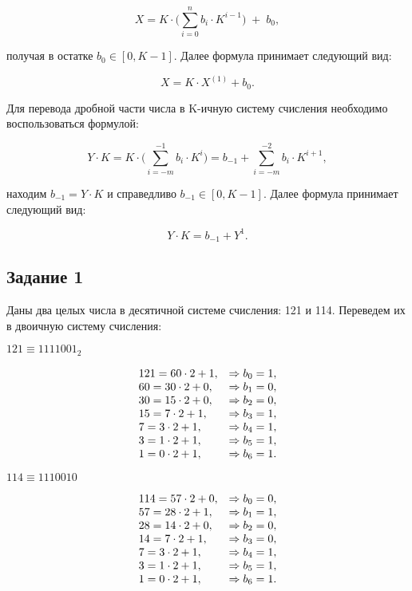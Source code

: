 \documentclass[a4paper,14pt]{extarticle}
\begin{document}
  \[
    X = K \cdot \Biggl(\sum_{i=0}^{n}b_{i} \cdot K^{i-1}\Biggl)\;+\; b_{0},
  \]

  \noindent получая в остатке $b_{0} \in [0, K - 1]$. Далее формула принимает следующий вид:

  \[
    X = K \cdot X^{(1)} + b_{0}.
  \]

  Для перевода дробной части числа в K-ичную систему счисления необходимо воспользоваться формулой:

  \[
    Y \cdot K = K \cdot \Biggl(\sum_{i=-m}^{-1}b_{i} \cdot K^{i}\Biggl) =b_{-1} + \sum_{i=-m}^{-2}b_{i} \cdot K^{i+1},
  \]

  находим $b_{-1} = Y \cdot K$ и справедливо $b_{-1} \in [0, K - 1]$. Далее формула принимает следующий вид:

  \[
    Y \cdot K = b_{-1} + Y^{1}.
  \]

  \subsection*{Задание 1}
  Даны два целых числа в десятичной системе счисления: 121 и 114. Переведем их в двоичную систему счисления:

  $121 \equiv 1111001_{2}$

  \[
  \begin{array}[c]{ll}
    121 = 60 \cdot 2 + 1, &\Rightarrow b_{0} = 1,\\
    60 = 30 \cdot 2 + 0, &\Rightarrow b_{1} = 0,\\
    30 = 15 \cdot 2 + 0, &\Rightarrow b_{2} = 0,\\
    15 = 7 \cdot 2 + 1, &\Rightarrow b_{3} = 1,\\
    7 = 3 \cdot 2 + 1, &\Rightarrow b_{4} = 1,\\
    3 = 1 \cdot 2 + 1, &\Rightarrow b_{5} = 1,\\
    1 = 0 \cdot 2 + 1, &\Rightarrow b_{6} = 1.
  \end{array}
  \]

  $114 \equiv 1110010 $

  \[
  \begin{array}[c]{ll}
    114 = 57 \cdot 2 + 0, &\Rightarrow b_{0} = 0,\\
    57 = 28 \cdot 2 + 1, &\Rightarrow b_{1} = 1,\\
    28 = 14 \cdot 2 + 0, &\Rightarrow b_{2} = 0,\\
    14 = 7 \cdot 2 + 1, &\Rightarrow b_{3} = 0,\\
    7 = 3 \cdot 2 + 1,  &\Rightarrow b_{4} = 1,\\
    3 = 1 \cdot 2 + 1,  &\Rightarrow b_{5} = 1,\\
    1 = 0 \cdot 2 + 1,  &\Rightarrow b_{6} = 1.
  \end{array}
  \]
\end{document}
